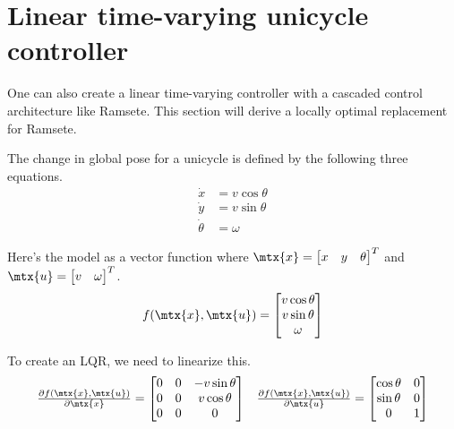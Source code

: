 \section{Linear time-varying unicycle controller}

One can also create a linear time-varying controller with a cascaded control
architecture like Ramsete. This section will derive a locally optimal
replacement for Ramsete.

The change in global pose for a unicycle is defined by the following three
equations.
\begin{align*}
  \dot{x} &= v\cos\theta \\
  \dot{y} &= v\sin\theta \\
  \dot{\theta} &= \omega
\end{align*}

Here's the model as a vector function where
$\mtx{x} = \begin{bmatrix} x & y & \theta \end{bmatrix}^T$ and
$\mtx{u} = \begin{bmatrix} v & \omega \end{bmatrix}^T$.
\begin{equation}
  f(\mtx{x}, \mtx{u}) =
  \begin{bmatrix}
    v\cos\theta \\
    v\sin\theta \\
    \omega
  \end{bmatrix}
\end{equation}

To create an LQR, we need to linearize this.
\begin{equation*}
  \begin{array}{ll}
    \frac{\partial f(\mtx{x}, \mtx{u})}{\partial\mtx{x}} =
    \begin{bmatrix}
      0 & 0 & -v\sin\theta \\
      0 & 0 & v\cos\theta \\
      0 & 0 & 0
    \end{bmatrix} &
    \frac{\partial f(\mtx{x}, \mtx{u})}{\partial\mtx{u}} =
    \begin{bmatrix}
      \cos\theta & 0 \\
      \sin\theta & 0 \\
      0 & 1
    \end{bmatrix}
  \end{array}
\end{equation*}

